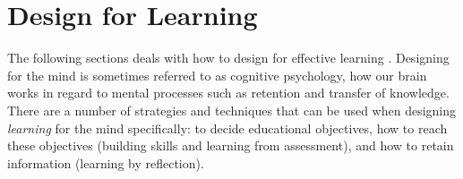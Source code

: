 \section{Design for Learning}


The following sections deals with how to design for effective learning \citep{dirksen}. Designing for the mind is sometimes referred to as cognitive psychology, how our brain works in regard to mental processes such as retention and transfer of knowledge. There are a number of strategies and techniques that can be used when designing \textit{learning} for the mind specifically: to decide educational objectives, how to reach these objectives (building skills and learning from assessment), and how to retain information (learning by reflection).






%

